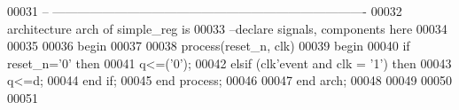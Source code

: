 \begin{DoxyCode}
00031 \textcolor{keyword}{-- ----------------------------------------------------------------------------}
00032 \textcolor{keywordflow}{architecture} arch \textcolor{keywordflow}{of} simple_reg is
00033 \textcolor{keyword}{--declare signals,  components here}
00034 
00035   
00036 \textcolor{vhdlkeyword}{begin}
00037 
00038   \textcolor{keywordflow}{process}(reset_n, clk)
00039 \textcolor{vhdlkeyword}{    begin}
00040       \textcolor{keywordflow}{if} \textcolor{vhdlchar}{reset_n}\textcolor{vhdlchar}{=}\textcolor{vhdlchar}{'}\textcolor{vhdllogic}{}\textcolor{vhdllogic}{0}\textcolor{vhdlchar}{'} \textcolor{keywordflow}{then}
00041         \textcolor{vhdlchar}{q}\textcolor{vhdlchar}{<=}\textcolor{vhdlchar}{(}\textcolor{vhdlchar}{'}\textcolor{vhdllogic}{}\textcolor{vhdllogic}{0}\textcolor{vhdlchar}{'}\textcolor{vhdlchar}{)};  
00042         \textcolor{keywordflow}{elsif} \textcolor{vhdlchar}{(}\textcolor{vhdlchar}{clk}\textcolor{vhdlchar}{'}\textcolor{vhdlkeyword}{event} \textcolor{keywordflow}{and} \textcolor{vhdlchar}{clk} \textcolor{vhdlchar}{=} \textcolor{vhdlchar}{'}\textcolor{vhdllogic}{}\textcolor{vhdllogic}{1}\textcolor{vhdlchar}{'}\textcolor{vhdlchar}{)} \textcolor{keywordflow}{then}
00043           \textcolor{vhdlchar}{q}\textcolor{vhdlchar}{<=}\textcolor{vhdlchar}{d};
00044         \textcolor{keywordflow}{end} \textcolor{keywordflow}{if};
00045     \textcolor{keywordflow}{end} \textcolor{keywordflow}{process};
00046   
00047 \textcolor{keywordflow}{end} \textcolor{vhdlchar}{arch};   
00048 
00049 
00050 
00051 
\end{DoxyCode}
